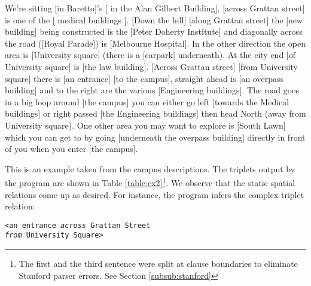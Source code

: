 \documentclass{acm_proc_article-sp}
\begin{document}
\begin{example}
\label{ex:c1}
We're sitting $[$in Baretto$]$'s $[$ in the Alan Gilbert Building$]$, $[$across Grattan street$]$ is one of the $[$ medical buildings $]$. $[$Down the hill$]$ $[$along Grattan street$]$ the $[$new building$]$ being constructed is the $[$Peter Doherty Institute$]$ and diagonally across the road ($[$Royal Parade$]$) is $[$Melbourne Hospital$]$. In the other direction the open area is $[$University square$]$ (there is a $[$carpark$]$ underneath). At the city end $[$of University square$]$ is $[$the law building$]$. $[$Across Grattan street$]$ $[$from University square$]$ there is $[$an entrance$]$ $[$to the campus$]$, straight ahead is $[$an overpass building$]$ and to the right are the various $[$Engineering buildings$]$. The road goes in a big loop around $[$the campus$]$ you can either go left $[$towards the Medical buildings$]$ or right passed $[$the Engineering buildings$]$ then head North (away from University square). One other area you may want to explore is $[$South Lawn$]$ which you can get to by going $[$underneath the overpass building$]$ directly in front of you when you enter $[$the campus$]$.
\end{example}
This is an example taken from the campus descriptions. The triplets output by the program are shown in Table \ref{table:ex2}\footnote{The first and the third sentence were split at clause boundaries to eliminate Stanford parser errors. See Section \ref{subsub:stanford}}. We observe that the static spatial relations come up as desired. For instance, the program infers the complex triplet relation:

\texttt{<an entrance \textit{across} Grattan Street}\\ \texttt{\textit{from} University Square>} 
\end{document}

